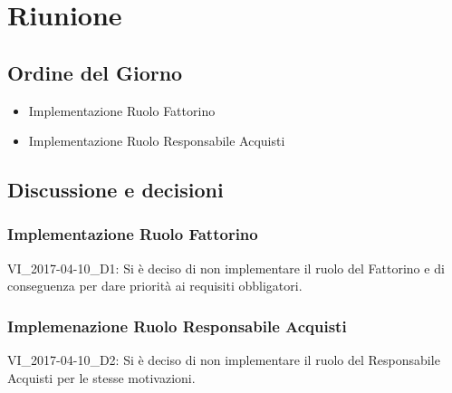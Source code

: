 \section{Riunione}
\subsection{Ordine del Giorno}
\begin{itemize}
	\item Implementazione Ruolo Fattorino
	\item Implementazione Ruolo Responsabile Acquisti
\end{itemize}

\subsection{Discussione e decisioni}

\subsubsection{Implementazione Ruolo Fattorino}
VI\_2017-04-10\_D1: Si è deciso di non implementare il ruolo del Fattorino e di conseguenza per dare priorità ai requisiti obbligatori.

\subsubsection{Implemenazione Ruolo Responsabile Acquisti}
VI\_2017-04-10\_D2: Si è deciso di non implementare il ruolo del Responsabile Acquisti per le stesse motivazioni.

\clearpage
